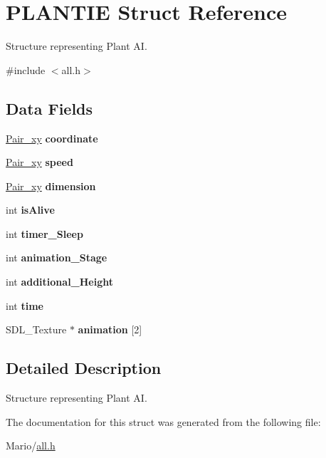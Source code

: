 \hypertarget{struct_p_l_a_n_t_i_e}{}\section{P\+L\+A\+N\+T\+IE Struct Reference}
\label{struct_p_l_a_n_t_i_e}


Structure representing Plant AI.  




{\ttfamily \#include $<$all.\+h$>$}

\subsection*{Data Fields}
\begin{DoxyCompactItemize}
\item 
\mbox{\label{struct_p_l_a_n_t_i_e_a6cf77a9254df5cfd669084e0a97d9711}} 
\mbox{\hyperlink{all_8h_a9a35f73dcc6cf9a466e6542847bd8882}{Pair\+\_\+xy}} {\bfseries coordinate}
\item 
\mbox{\label{struct_p_l_a_n_t_i_e_a17e25b2ef4c597ac58da845ec3bce5c6}} 
\mbox{\hyperlink{all_8h_a9a35f73dcc6cf9a466e6542847bd8882}{Pair\+\_\+xy}} {\bfseries speed}
\item 
\mbox{\label{struct_p_l_a_n_t_i_e_a0da7d680eb31a67eac3371518ae0a6cb}} 
\mbox{\hyperlink{all_8h_a9a35f73dcc6cf9a466e6542847bd8882}{Pair\+\_\+xy}} {\bfseries dimension}
\item 
\mbox{\label{struct_p_l_a_n_t_i_e_a116ae74d5b3df6d48cdb0f3a6bb36a07}} 
int {\bfseries is\+Alive}
\item 
\mbox{\label{struct_p_l_a_n_t_i_e_a9c6379896c4f64966b4fae0883204983}} 
int {\bfseries timer\+\_\+\+Sleep}
\item 
\mbox{\label{struct_p_l_a_n_t_i_e_a6118bdc05fce34a198c8e8d332708235}} 
int {\bfseries animation\+\_\+\+Stage}
\item 
\mbox{\label{struct_p_l_a_n_t_i_e_a839c2204ba20d7191f8a8e284bc67426}} 
int {\bfseries additional\+\_\+\+Height}
\item 
\mbox{\label{struct_p_l_a_n_t_i_e_a42715f65f02da52edc5b22021d8ae670}} 
int {\bfseries time}
\item 
\mbox{\label{struct_p_l_a_n_t_i_e_a1fcacba509b1d227e8ed36abf701510b}} 
S\+D\+L\+\_\+\+Texture $\ast$ {\bfseries animation} \mbox{[}2\mbox{]}
\end{DoxyCompactItemize}


\subsection{Detailed Description}
Structure representing Plant AI. 

The documentation for this struct was generated from the following file\+:\begin{DoxyCompactItemize}
\item 
Mario/\mbox{\hyperlink{all_8h}{all.\+h}}\end{DoxyCompactItemize}
